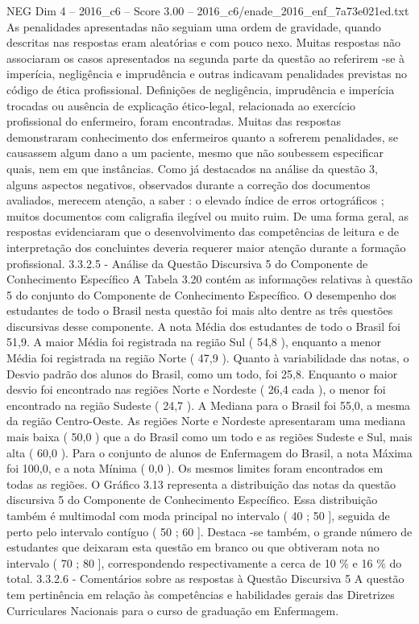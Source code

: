 \begin{textsample}{NEG Dim 4 – 2016\_c6 – Score 3.00 – 2016\_c6/enade\_2016\_enf\_7a73e021ed.txt}
As penalidades apresentadas não seguiam uma ordem de gravidade, quando descritas nas respostas eram aleatórias e com pouco nexo.
Muitas respostas não associaram os casos apresentados na segunda parte da questão ao referirem -se à imperícia, negligência e imprudência e outras indicavam penalidades previstas no código de ética profissional.
Definições de negligência, imprudência e imperícia trocadas ou ausência de explicação ético-legal, relacionada ao exercício profissional do enfermeiro, foram encontradas.
Muitas das respostas demonstraram conhecimento dos enfermeiros quanto a sofrerem penalidades, se causassem algum dano a um paciente, mesmo que não soubessem especificar quais, nem em que instâncias.
Como já destacados na análise da questão 3, alguns aspectos negativos, observados durante a correção dos documentos avaliados, merecem atenção, a saber : o elevado índice de erros ortográficos ; muitos documentos com caligrafia ilegível ou muito ruim.
De uma forma geral, as respostas evidenciaram que o desenvolvimento das competências de leitura e de interpretação dos concluintes deveria requerer maior atenção durante a formação profissional. 3.3.2.5 - Análise da Questão Discursiva 5 do Componente de Conhecimento Específico A Tabela 3.20 contém as informações relativas à questão 5 do conjunto do Componente de Conhecimento Específico.
O desempenho dos estudantes de todo o Brasil nesta questão foi mais alto dentre as três questões discursivas desse componente.
A nota Média dos estudantes de todo o Brasil foi 51,9.
A maior Média foi registrada na região Sul ( 54,8 ), enquanto a menor Média foi registrada na região Norte ( 47,9 ).
Quanto à variabilidade das notas, o Desvio padrão dos alunos do Brasil, como um todo, foi 25,8.
Enquanto o maior desvio foi encontrado nas regiões Norte e Nordeste ( 26,4 cada ), o menor foi encontrado na região Sudeste ( 24,7 ).
A Mediana para o Brasil foi 55,0, a mesma da região Centro-Oeste.
As regiões Norte e Nordeste apresentaram uma mediana mais baixa ( 50,0 ) que a do Brasil como um todo e as regiões Sudeste e Sul, mais alta ( 60,0 ).
Para o conjunto de alunos de Enfermagem do Brasil, a nota Máxima foi 100,0, e a nota Mínima ( 0,0 ).
Os mesmos limites foram encontrados em todas as regiões.
O Gráfico 3.13 representa a distribuição das notas da questão discursiva 5 do Componente de Conhecimento Específico.
Essa distribuição também é multimodal com moda principal no intervalo ( 40 ; 50 ], seguida de perto pelo intervalo contíguo ( 50 ; 60 ].
Destaca -se também, o grande número de estudantes que deixaram esta questão em branco ou que obtiveram nota no intervalo ( 70 ; 80 ], correspondendo respectivamente a cerca de 10 \% e 16 \% do total. 3.3.2.6 - Comentários sobre as respostas à Questão Discursiva 5 A questão tem pertinência em relação às competências e habilidades gerais das Diretrizes Curriculares Nacionais para o curso de graduação em Enfermagem.

\end{textsample}
